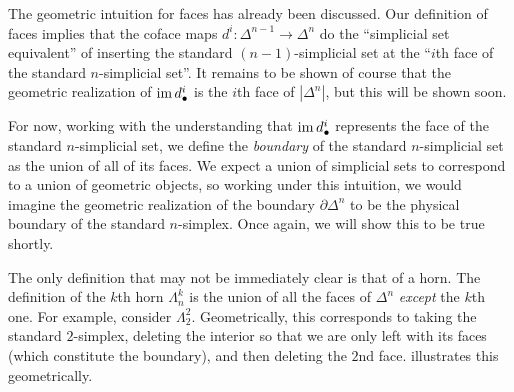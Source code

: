 \begin{intuition}\label{3.4.10}
    The geometric intuition for faces has already been discussed. Our definition of faces implies that the coface maps $d^i : \Delta^{n-1}\to\Delta^n$ do the ``simplicial set equivalent'' of inserting the standard $(n-1)$-simplicial set at the ``$i$th face of the standard $n$-simplicial set''. It remains to be shown of course that the geometric realization of $\operatorname{im} d^i_\bullet$ is the $i$th face of $|\Delta^n|$, but this will be shown soon.

    For now, working with the understanding that $\operatorname{im} d^i_\bullet$ represents the face of the standard $n$-simplicial set, we define the \emph{boundary} of the standard $n$-simplicial set as the union of all of its faces. We expect a union of simplicial sets to correspond to a union of geometric objects, so working under this intuition, we would imagine the geometric realization of the boundary $\partial\Delta^n$ to be the physical boundary of the standard $n$-simplex. Once again, we will show this to be true shortly.

    The only definition that may not be immediately clear is that of a horn. The definition of the $k$th horn $\Lambda_n^k$ is the union of all the faces of $\Delta^n$ \emph{except} the $k$th one. For example, consider $\Lambda_2^2$. Geometrically, this corresponds to taking the standard $2$-simplex, deleting the interior so that we are only left with its faces (which constitute the boundary), and then deleting the $2$nd face.  illustrates this geometrically.
    \begin{figure}[ht]
        \centering
\end{figure}
\end{intuition}
